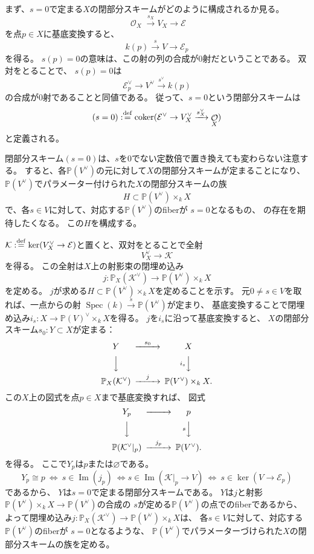 \documentclass[uplatex]{jsarticle}
\theoremstyle{definition}
\DeclareMathOperator{\im}{\mathrm{Im}}
\DeclareMathOperator{\coker}{\mathrm{coker}}
\DeclareMathOperator{\Spec}{\mathrm{Spec}}
\renewcommand{\P}{\mathbb{P}}
\newcommand{\mcE}{\mathcal{E}}
\newcommand{\mcK}{\mathcal{K}}
\newcommand{\mcO}{\mathcal{O}}
\DeclareMathOperator{\OOO}{\mcO}
\newcommand{\OX}{\OOO_X}
\renewcommand{\emptyset}{\varnothing}
\newcommand{\dfn}{:\overset{\mathrm{\scriptsize def}}{=}}
\begin{document}
まず、\(s=0\)で定まる\(X\)の閉部分スキームがどのように構成されるか見る。
\[
\OX \xrightarrow{s_X} V_X\to \mcE
\]
を点\(p\in X\)に基底変換すると、
\[
k(p) \xrightarrow{s} V \to \mcE_p
\]
を得る。
\(s(p)=0\)の意味は、この射の列の合成が\(0\)射だということである。
双対をとることで、
\(s(p)=0\)は
\[
\mcE_p^{\vee}\to V^{\vee}\xrightarrow{s^{\vee}} k(p)
\]
の合成が\(0\)射であることと同値である。
従って、\(s=0\)という閉部分スキームは
\[
(s=0) \dfn \coker(\mcE^{\vee} \to V_X^{\vee} \xrightarrow{s^{\vee}_X} \OX)
\]
と定義される。

閉部分スキーム\((s=0)\)は、\(s\)を\(0\)でない定数倍で置き換えても変わらない注意する。
すると、各\(\P(V^{\vee})\)の元に対して\(X\)の閉部分スキームが定まることになり、
\(\P(V^{\vee})\)でパラメーター付けられた\(X\)の閉部分スキームの族
\[
H\subset \P(V^{\vee})\times_kX
\]
で、各\(s\in V\)に対して、対応する\(\P(V^{\vee})\)のfiberが
\(s=0\)となるもの、
の存在を期待したくなる。
この\(H\)を構成する。

\(\mcK\dfn \ker(V_X^{\vee}\to \mcE)\)と置くと、双対をとることで全射
\[
V_X^{\vee}\to \mcK
\]
を得る。
この全射は\(X\)上の射影束の閉埋め込み
\[
j:\P_X(\mcK^{\vee})\to \P(V^{\vee})\times_kX
\]
を定める。
\(j\)が求める\(H\subset \P(V^{\vee})\times_kX\)を定めることを示す。
元\(0\neq s\in V\)を取れば、一点からの射
\(\Spec(k)\xrightarrow{s} \P(V^{\vee})\)が定まり、
基底変換することで閉埋め込み\(i_s:X\to \P(V)^{\vee}\times_kX\)を得る。
\(j\)を\(i_s\)に沿って基底変換すると、
\(X\)の閉部分スキーム\(s_0:Y\subset X\)が定まる：
\[
\begin{CD}
  Y @>s_0>> X \\
  @VVV @Vi_sVV \\
\P_X(\mcK^{\vee}) @>j>> \P(V^{\vee})\times_kX.
\end{CD}
\]
この\(X\)上の図式を点\(p\in X\)まで基底変換すれば、
図式
\[
\begin{CD}
  Y_p @>>> p \\
  @VVV @VsVV \\
  \P(\mcK^{\vee}|_p) @>j_p>> \P(V^{\vee}).
\end{CD}
\]
を得る。
ここで\(Y_p\)は\(p\)または\(\emptyset\)である。
\[
Y_p\cong p \ \iff \ s\in \im(j_p) \ \iff s\in \im (\mcK|_p\to V) \
\iff \ s\in \ker(V\to \mcE_p)
\]
であるから、
\(Y\)は\(s=0\)で定まる閉部分スキームである。
\(Y\)は\(j\)と射影\(\P(V^{\vee})\times_kX\to \P(V^{\vee})\)の合成の
\(s\)が定める\(\P(V^{\vee})\)の点でのfiberであるから、
よって閉埋め込み\(j:\P_X(\mcK^{\vee})\to \P(V^{\vee})\times_kX\)は、
各\(s\in V\)に対して、対応する\(\P(V^{\vee})\)のfiberが
\(s=0\)となるような、
\(\P(V^{\vee})\)でパラメーターづけられた\(X\)の閉部分スキームの族を定める。
\end{document}
